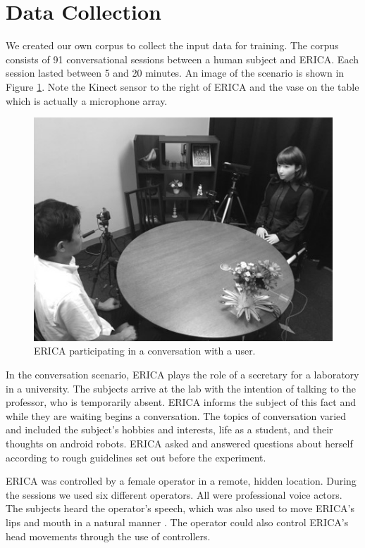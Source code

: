 \documentclass[letterpaper]{article} %
\begin{document}
\section{Data Collection}\label{data}
We created our own corpus to collect the input data for training. The corpus consists of 91 conversational sessions between a human subject and ERICA. Each session lasted between 5 and 20 minutes. An image of the scenario is shown in Figure \ref{ericaconvo}. Note the Kinect sensor to the right of ERICA and the vase on the table which is actually a microphone array.

\begin{figure}
	\centering
		\includegraphics{ericaconvo.jpg}
	\caption{ERICA participating in a conversation with a user.}
		\label{ericaconvo}
\end{figure}

In the conversation scenario, ERICA plays the role of a secretary for a laboratory in a university. The subjects arrive at the lab with the intention of talking to the professor, who is temporarily absent. ERICA informs the subject of this fact and while they are waiting begins a conversation. The topics of conversation varied and included the subject's hobbies and interests, life as a student, and their thoughts on android robots. ERICA asked and answered questions about herself according to rough guidelines set out before the experiment.

ERICA was controlled by a female operator in a remote, hidden location. During the sessions we used six different operators. All were professional voice actors. The subjects heard the operator's speech, which was also used to move ERICA's lips and mouth in a natural manner \cite{Sakai2015}. The operator could also control ERICA's head movements through the use of controllers.
\end{document}
